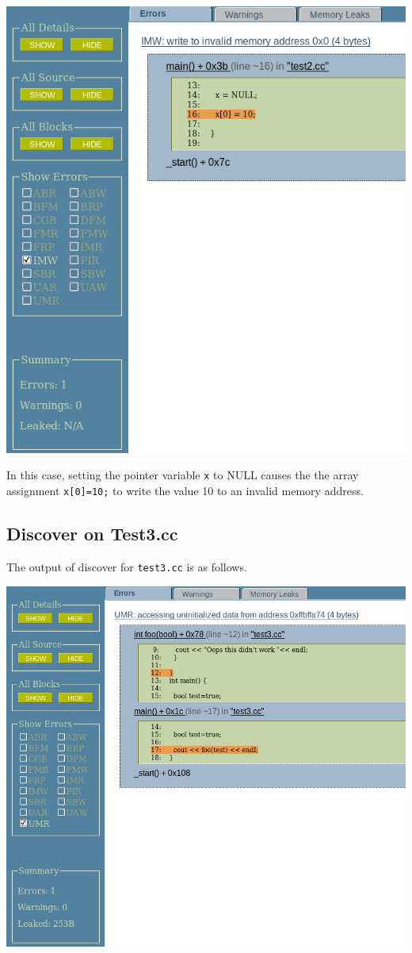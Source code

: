 \documentclass[12pt]{article}
\begin{document}
\begin{center}
\includegraphics[width=5 in]{images/test2.png}
\end{center}

In this case, setting the pointer variable \verb+x+ to NULL causes the
the array assignment \verb+x[0]=10;+ to write the value 10 to an 
invalid memory address.

\subsection{Discover on Test3.cc}
The output of discover for \verb+test3.cc+ is as follows.
\begin{center}
\includegraphics[width=5 in]{images/test3.png}
\end{center}
\end{document}
